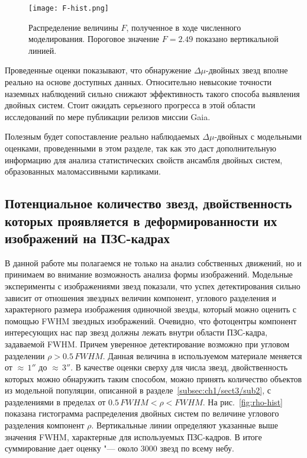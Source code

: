 \begin{figure}[pt]\label{fig:F-hist}
\centering
\texttt{[image: F-hist.png]}
\caption{Распределение величины $F$, полученное в ходе численного моделирования. Пороговое значение $F=2.49$ показано вертикальной линией. }
\end{figure}

Проведенные оценки показывают, что обнаружение $\Delta\mu$-двойных звезд вполне реально на основе доступных данных. Относительно невысокие точности наземных наблюдений сильно  снижают эффективность такого способа выявления двойных систем. Стоит ожидать серьезного прогресса в этой области исследований по мере публикации релизов миссии Gaia.

Полезным будет сопоставление реально наблюдаемых  $\Delta\mu$-двойных с модельными оценками, проведенными в этом разделе, так как это даст дополнительную информацию для анализа статистических свойств ансамбля двойных систем, образованных маломассивными карликами.

\subsection{Потенциальное количество звезд, двойственность которых проявляется в деформированности их изображений на ПЗС-кадрах}\label{subsec:ch1/sect3/sub3}

В данной работе мы полагаемся не только на анализ собственных движений, но и принимаем во внимание возможность анализа формы изображений.  Модельные эксперименты с изображениями звезд показали, что успех детектирования сильно зависит от отношения звездных величин компонент, углового разделения и характерного размера изображения одиночной звезды, который можно оценить с помощью FWHM звездных изображений. Очевидно, что фотоцентры компонент интересующих нас пар звезд должны лежать внутри области ПЗС-кадра, задаваемой FWHM. Причем уверенное детектирование возможно при угловом разделении $\rho>0.5\,FWHM$.  Данная величина в используемом материале меняется от $\approx\,1''$ до $\approx\,3''$.  В качестве оценки сверху для числа звезд, двойственность которых можно обнаружить таким способом, можно принять количество объектов из модельной популяции, описанной в разделе~\ref{subsec:ch1/sect3/sub2}, с разделениями в пределах от $0.5\,FWHM<\rho<FWHM$. На рис.~\ref{fig:rho-hist} показана гистограмма распределения двойных систем по величине углового разделения компонент $\rho$. Вертикальные линии определяют указанные выше значения FWHM, характерные для используемых ПЗС-кадров. В итоге суммирование дает оценку "--- около 3000 звезд по всему небу.  

